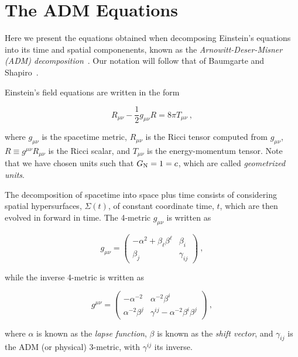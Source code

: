 \documentclass[a4paper,11pt]{article}
\renewcommand{\a}{\alpha}
\renewcommand{\b}{\beta}
\newcommand{\g}{\gamma}
\newcommand{\gDD}[2]{\g_{{#1}{#2}}}
\newcommand{\gUU}[2]{\g^{{#1}{#2}}}
\newcommand{\GDD}[2]{g_{{#1}{#2}}}
\newcommand{\GUU}[2]{g^{{#1}{#2}}}
\newcommand{\lrpar}[1]{\left( #1 \right)}
\newcommand{\n}{\noindent}
\newcommand{\eq}[1]{
  \begin{equation}
    #1
  \end{equation}
}
\begin{document}
\section{The ADM Equations}

Here we present the equations obtained when decomposing Einstein's equations into its time and spatial componenents, known as the \emph{Arnowitt-Deser-Misner (ADM) decomposition}~\cite{Arnowitt:1959ah}. Our notation will follow that of Baumgarte and Shapiro~\cite{Baumgarte:2010ndz}.

Einstein's field equations are written in the form

\eq{
  R_{\mu\nu} - \frac{1}{2}\GDD{\mu}{\nu}R = 8\pi T_{\mu\nu}\ ,
}

\n where $\GDD{\mu}{\nu}$ is the spacetime metric, $R_{\mu\nu}$ is the Ricci tensor computed from $\GDD{\mu}{\nu}$, $R \equiv \GUU{\mu}{\nu}R_{\mu\nu}$ is the Ricci scalar, and $T_{\mu\nu}$ is the energy-momentum tensor. Note that we have chosen units such that $G_{\rm N}=1=c$, which are called \emph{geometrized units}.

The decomposition of spacetime into space plus time consists of considering spatial hypersurfaces, $\Sigma\lrpar{t}$, of constant coordinate time, $t$, which are then evolved in forward in time. The 4-metric $\GDD{\mu}{\nu}$ is written as

\eq{
  \GDD{\mu}{\nu} =
  \begin{pmatrix}
    -\a^{2} + \b_{\ell}\b^{\ell} & \b_{i}\\
    \b_{j} & \gDD{i}{j}
  \end{pmatrix}\ ,
}

\n while the inverse 4-metric is written as

\eq{
  \GUU{\mu}{\nu} =
  \begin{pmatrix}
    -\a^{-2} & \a^{-2}\b^{i}\\
    \a^{-2}\b^{j} & \gUU{i}{j} - \a^{-2}\b^{i}\b^{j}
  \end{pmatrix}\ ,
}

\n where $\a$ is known as the \emph{lapse function}, $\b$ is known as the \emph{shift vector}, and $\gDD{i}{j}$ is the ADM (or physical) 3-metric, with $\gUU{i}{j}$ its inverse.
\end{document}
